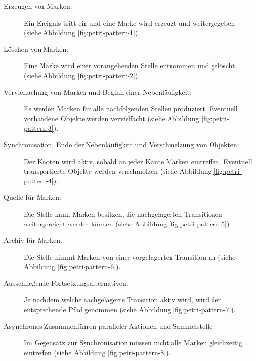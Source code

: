 \begin{description}
\item[Erzeugen von Marken:] Ein Ereignis tritt ein und eine Marke wird erzeugt und weitergegeben (siehe Abbildung \ref{fig:petri-pattern-1}).

\item[Löschen von Marken:] Eine Marke wird einer vorangehenden Stelle entnommen und gelöscht (siehe Abbildung \ref{fig:petri-pattern-2}).

\item[Vervielfachung von Marken und Beginn einer Nebenläufigkeit:] Es werden Marken für alle nachfolgenden Stellen produziert. Eventuell vorhandene Objekte werden vervielfacht (siehe Abbildung \ref{fig:petri-pattern-3}).

\item[Synchronisation, Ende der Nebenläufigkeit und Verschmelzung von Objekten:] Der Knoten wird aktiv, sobald an jeder Kante Marken eintreffen. Eventuell transportierte Objekte werden verschmolzen (siehe Abbildung \ref{fig:petri-pattern-4}).

\item[Quelle für Marken:] Die Stelle kann Marken besitzen, die nachgelagerten Transitionen weitergereicht werden können (siehe Abbildung \ref{fig:petri-pattern-5}).

\item[Archiv für Marken:] Die Stelle nimmt Marken von einer vorgelagerten Transition an (siehe Abbildung \ref{fig:petri-pattern-6}).

\item[Ausschließende Fortsetzungsalternativen:] Je nachdem welche nachgelagerte Transition aktiv wird, wird der entsprechende Pfad genommen (siehe Abbildung \ref{fig:petri-pattern-7}).

\item[Asynchrones Zusammenführen paralleler Aktionen und Sammelstelle:] Im Gegensatz zur Synchronisation müssen nicht alle Marken gleichzeitig eintreffen (siehe Abbildung \ref{fig:petri-pattern-8}).
\end{description}


